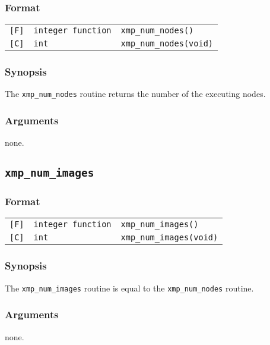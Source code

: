 \subsubsection*{Format}

\begin{tabular}{lll}
\verb![F]!&  {\tt integer function}& {\tt xmp\_num\_nodes()}\\
\verb![C]!&  {\tt int}& {\tt xmp\_num\_nodes(void)}
\end{tabular}

\subsubsection*{Synopsis}
The {\tt xmp\_num\_nodes} routine returns the number of the executing nodes.

\subsubsection*{Arguments}
none.

\subsection{\tt xmp\_num\_images}\label{sub:xmpnumimages}

\subsubsection*{Format}

\begin{tabular}{lll}
\verb![F]!&  {\tt integer function}& {\tt xmp\_num\_images()}\\
\verb![C]!&  {\tt int}& {\tt xmp\_num\_images(void)}
\end{tabular}

\subsubsection*{Synopsis}
The {\tt xmp\_num\_images} routine is equal to the {\tt xmp\_num\_nodes} routine.

\subsubsection*{Arguments}
none.

